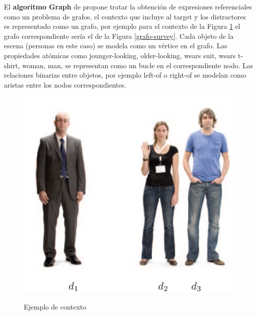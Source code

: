 El {\bf algoritmo Graph} de \cite{Krahmer:2003} propone tratar la obtenci\'on de expresiones referenciales como un problema de grafos, el contexto que incluye al target y los distractores es representado como un grafo, por ejemplo para el contexto de la Figura \ref{figura-survey} el grafo correspondiente ser\'ia el de la Figura \ref{grafo-survey}. Cada objeto de la escena (personas en este caso) se modela como un v\'ertice en el grafo. Las propiedades at\'omicas como jounger-looking, older-looking, wears suit, wears t-shirt, woman, man, se representan como un bucle en el correspondiente nodo. Las relaciones binarias entre objetos, por ejemplo left-of o right-of se modelan como aristas entre los nodos correspondientes.

\begin{figure}[!ht]
\begin{minipage}[t]{0.4\linewidth}
\centering
\includegraphics[width=\textwidth]{images/contexto-survey.png}\\[0pt]
\caption{Ejemplo de contexto}
\label{figura-survey}
\vspace*{.1cm}
\end{minipage}
\hspace*{0cm}
\begin{minipage}[t]{0.6\linewidth}
\centering

\end{minipage}
\end{figure}
